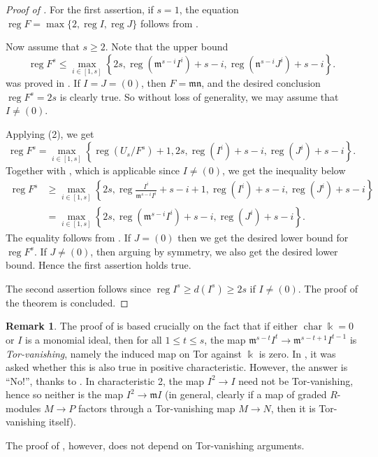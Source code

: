 \documentclass{amsart}
\DeclareMathOperator{\chara}{char}
\DeclareMathOperator{\reg}{reg}
\newcommand{\mm}{\mathfrak{m}}
\newcommand{\nn}{\mathfrak{n}}
\theoremstyle{plain}
\theoremstyle{definition}
\newtheorem{rem}[thm]{Remark}
\numberwithin{equation}{section}
\newcommand{\kk}{\Bbbk}
\begin{document}
\begin{proof}[Proof of ]
For the first assertion, if $s=1$, the equation $\reg F=\max\{2, \reg I, \reg J\}$ follows from .


Now assume that $s\ge 2$. Note that the upper bound
\[
\reg F^s \le \max \limits_{i\in [1,s]} \left\{2s,\reg(\mm^{s-i}I^i)+s-i, \reg(\nn^{s-i}J^i)+s-i\right\}. 
\]
was proved in . If $I=J=(0)$, then $F=\mm\nn$, and the desired conclusion $\reg F^s=2s$ is clearly true. So without loss of generality, we may assume that $I\neq (0)$.

Applying (2), we get
\[
\reg F^s= \max_{i\in [1,s]} \left\{\reg(U_s/F^s)+1, 2s, \reg(I^i)+s-i, \reg(J^i)+s-i\right\}.
\]
Together with , which is applicable since $I\neq (0)$, we get the inequality below
\begin{align*}
\reg F^s &\ge \max_{i\in [1,s]} \left\{2s, \reg \frac{I^i}{\mm^{s-i}I^i}+s-i+1, \reg(I^i)+s-i, \reg(J^i)+s-i\right\}\\
         &= \max_{i\in [1,s]} \left\{2s, \reg(\mm^{s-i}I^i)+s-i, \reg(J^i)+s-i\right\}.
\end{align*}
The equality follows from . If $J=(0)$ then we get the desired lower bound for $\reg F^s$. If $J\neq (0)$, then arguing by symmetry, we also get the desired lower bound. Hence the first assertion holds true.

The second assertion follows since $\reg I^s\ge d(I^s)\ge 2s$ if $I\neq (0)$. The proof of the theorem is concluded. 
\end{proof}
\begin{rem}
\label{rem_noTor-vanishing}
The proof of \cite[Theorem 5.1]{NgV19b} is based crucially on the fact that if either $\chara \kk=0$ or $I$ is a monomial ideal, then for all $1\le t\le s$, the map $\mm^{s-t}I^t \to \mm^{s-t+1}I^{t-1}$ is \emph{Tor-vanishing}, namely the induced map on Tor against $\kk$ is zero. In \cite[Question 4.2]{NgV19b}, it was asked whether this is also true in positive characteristic. However, the answer is ``No!'', thanks to \cite[Example 3.9]{NgHo22}. In characteristic 2, the map $I^2\to I$ need not be Tor-vanishing, hence so neither is the map $I^2\to \mm I$ (in general, clearly if a map of graded $R$-modules $M\to P$ factors through a Tor-vanishing map $M\to N$, then it is Tor-vanishing itself).

The proof of , however, does not depend on Tor-vanishing arguments.
\end{rem}
\end{document}
